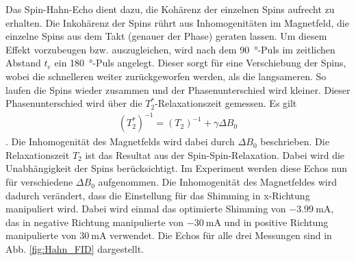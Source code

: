 \documentclass[../main.tex]{subfiles}
\begin{document}
    Das Spin-Hahn-Echo dient dazu, die Kohärenz der einzelnen Spins aufrecht zu erhalten. Die Inkohärenz der Spins rührt aus Inhomogenitäten im Magnetfeld, die einzelne Spins aus dem \glqq{}Takt\grqq{} (genauer der Phase) geraten lassen. Um diesem Effekt vorzubeugen bzw. auszugleichen, wird nach dem \SI{90}{\degree}-Puls im zeitlichen Abstand $t_{e}$ ein \SI{180}{\degree}-Puls angelegt. Dieser sorgt für eine Verschiebung der Spins, wobei die schnelleren weiter zurückgeworfen werden, als die langsameren. So laufen die Spins wieder zusammen und der Phasenunterschied wird kleiner. Dieser Phasenunterschied wird über die $T_{2}^{*}$-Relaxationszeit gemessen. Es gilt 
    \begin{align}
        (T_{2}^{*})^{-1} = (T_{2})^{-1} + \gamma \Delta B_{0}
    \end{align}.
    Die Inhomogenität des Magnetfelds wird dabei durch $\Delta B_{0}$ beschrieben. Die Relaxationszeit $T_{2}$ ist das Resultat aus der Spin-Spin-Relaxation. Dabei wird die Unabhängigkeit der Spins berücksichtigt. Im Experiment werden diese Echos nun für verschiedene $\Delta B_{0}$ aufgenommen. Die Inhomogenität des Magnetfeldes wird dadurch verändert, dass die Einstellung für das Shimming in x-Richtung manipuliert wird. Dabei wird einmal das optimierte Shimming von $\SI{-3,99}{\milli \ampere}$, das in negative Richtung manipulierte von $\SI{-30}{\milli \ampere}$ und in positive Richtung manipulierte von $\SI{30}{\milli \ampere}$ verwendet. Die Echos für alle drei Messungen sind in Abb. \ref{fig:Hahn_FID} dargestellt.
\end{document}
